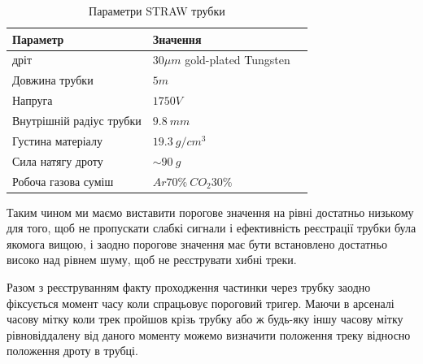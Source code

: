 \documentclass[pdftex,14pt]{scrartcl}
\begin{document}
\begin{spacing}{1.5}
	\begin{table}[h]
	\centering
	\caption[Table caption text]{Параметри STRAW трубки}
	\begin{tabular}{|l|l|p{8cm}|}
		\hline
		Параметр & Значення \\
		\hline
		дріт & $30\mu m$ gold-plated Tungsten \\
		\hline
		Довжина трубки & $5m$ \\
		\hline
		Напруга & $1750 V$ \\
		\hline
		Внутрішній радіус трубки & $9.8~mm$ \\
		\hline
		Густина матеріалу & $19.3 ~g/cm^3$ \\
		\hline
		Сила натягу дроту & $\sim 90~g$ \\
		\hline
		Робоча газова суміш & $Ar70\% ~CO_2 30\%$ \\
		\hline
	\end{tabular}
	
	\label{table:straw_par}
	\end{table}
	
	Таким чином ми маємо виставити порогове значення на рівні достатньо низькому для того, щоб не пропускати слабкі сигнали і ефективність реєстрації трубки була якомога вищою, і заодно порогове значення має бути встановлено достатньо високо над рівнем шуму, щоб не реєструвати хибні треки.
	

	Разом з реєструванням факту проходження частинки через трубку заодно фіксується момент часу коли спрацьовує пороговий тригер. Маючи в арсеналі часову мітку коли трек пройшов крізь трубку або ж будь-яку іншу часову мітку рівновіддалену від даного моменту можемо визначити положення треку відносно положення дроту в трубці.
	
		
	
	\begin{figure}[!h]
	\centering
\end{figure}
\end{spacing}
\end{document}
